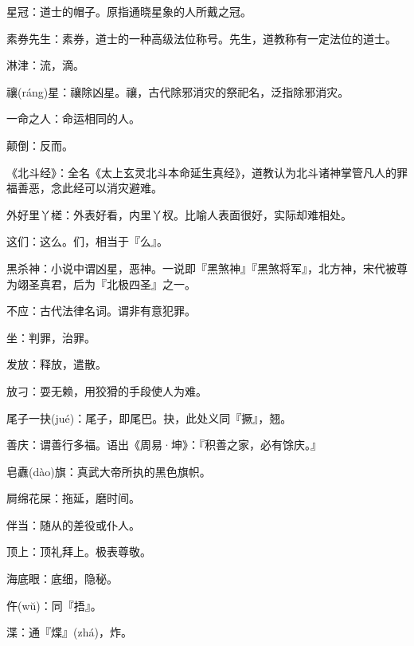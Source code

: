 \startbuffer[1198]
星冠：道士的帽子。原指通晓星象的人所戴之冠。
\stopbuffer


\startbuffer[1199]
素券先生：素券，道士的一种高级法位称号。先生，道教称有一定法位的道士。
\stopbuffer


\startbuffer[1200]
淋津：流，滴。
\stopbuffer


\startbuffer[1201]
禳(ráng)星：禳除凶星。禳，古代除邪消灾的祭祀名，泛指除邪消灾。
\stopbuffer


\startbuffer[1202]
一命之人：命运相同的人。
\stopbuffer


\startbuffer[1203]
颠倒：反而。
\stopbuffer


\startbuffer[1204]
《北斗经》：全名《太上玄灵北斗本命延生真经》，道教认为北斗诸神掌管凡人的罪福善恶，念此经可以消灾避难。
\stopbuffer


\startbuffer[1205]
外好里丫槎：外表好看，内里丫杈。比喻人表面很好，实际却难相处。
\stopbuffer


\startbuffer[1206]
这们：这么。们，相当于『么』。
\stopbuffer


\startbuffer[1207]
黑杀神：小说中谓凶星，恶神。一说即『黑煞神』『黑煞将军』，北方神，宋代被尊为翊圣真君，后为『北极四圣』之一。
\stopbuffer


\startbuffer[1208]
不应：古代法律名词。谓非有意犯罪。
\stopbuffer


\startbuffer[1209]
坐：判罪，治罪。
\stopbuffer


\startbuffer[1210]
发放：释放，遣散。
\stopbuffer


\startbuffer[1211]
放刁：耍无赖，用狡猾的手段使人为难。
\stopbuffer


\startbuffer[1212]
尾子一抉(jué)：尾子，即尾巴。抉，此处义同『撅』，翘。
\stopbuffer


\startbuffer[1213]
善庆：谓善行多福。语出《周易·坤》：『积善之家，必有馀庆。』
\stopbuffer


\startbuffer[1214]
皂纛(dào)旗：真武大帝所执的黑色旗帜。
\stopbuffer


\startbuffer[1215]
屙绵花屎：拖延，磨时间。
\stopbuffer


\startbuffer[1216]
伴当：随从的差役或仆人。
\stopbuffer


\startbuffer[1217]
顶上：顶礼拜上。极表尊敬。
\stopbuffer


\startbuffer[1218]
海底眼：底细，隐秘。
\stopbuffer


\startbuffer[1219]
仵(wŭ)：同『捂』。
\stopbuffer


\startbuffer[1220]
渫：通『煠』(zhá)，炸。
\stopbuffer


